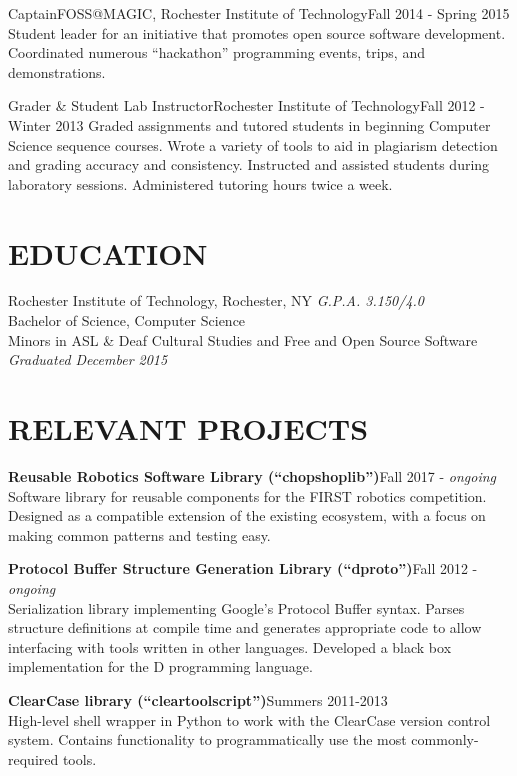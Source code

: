 \documentclass[line]{res}
\newcommand{\project}[2][]{{\bf #2}\hfill #1\\}
\def\ongoing{\textit{ongoing}}
\begin{document}
\begin{resume}
	\begin{job}{Captain}{FOSS@MAGIC, Rochester Institute of Technology}{Fall 2014 - Spring 2015}
		Student leader for an initiative that promotes open source software development.
		Coordinated numerous ``hackathon'' programming events, trips, and demonstrations.
	\end{job}

	\begin{job}{Grader \& Student Lab Instructor}{Rochester Institute of Technology}{Fall 2012 - Winter 2013}
		Graded assignments and tutored students in beginning Computer Science sequence courses.
		Wrote a variety of tools to aid in plagiarism detection and grading accuracy and consistency.
		Instructed and assisted students during laboratory sessions.
		Administered tutoring hours twice a week.
	\end{job}

\section{EDUCATION}

	Rochester Institute of Technology, Rochester, NY
	\hfill
	\textit{G.P.A. 3.150/4.0}
	\\
	Bachelor of Science, Computer Science
	\\
	Minors in ASL \& Deaf Cultural Studies and Free and Open Source Software
	\hfill
	\textit{Graduated December 2015}

\section{RELEVANT PROJECTS}

	\project[Fall 2017 - \ongoing]   {Reusable Robotics Software Library (``chopshoplib'')}
        Software library for reusable components for the FIRST robotics competition.
        Designed as a compatible extension of the existing ecosystem, with a focus on making common patterns and testing easy.

	\project[Fall 2012 - \ongoing]   {Protocol Buffer Structure Generation Library (``dproto'')}
	Serialization library implementing Google's Protocol Buffer syntax.
	Parses structure definitions at compile time and generates appropriate code to allow interfacing with tools written in other languages.
	Developed a black box implementation for the D programming language.

	\project[Summers 2011-2013]      {ClearCase library (``cleartoolscript'')}
	High-level shell wrapper in Python to work with the ClearCase version control system.
	Contains functionality to programmatically use the most commonly-required tools.


\end{resume}
\end{document}
